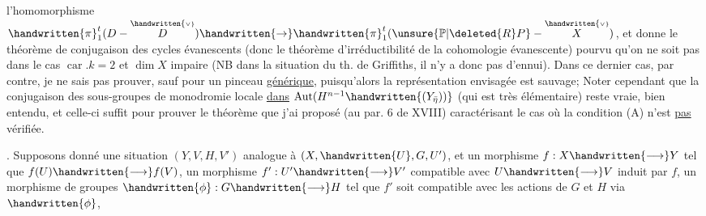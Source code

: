 l'homomorphisme $\handwritten{\pi}_1^t(D-\overset{\handwritten{\scriptscriptstyle\vee}}{D})\handwritten{\rightarrow}\handwritten{\pi}_1^t(\unsure{\mathbb{P}|\deleted{R}P}-\overset{\handwritten{\scriptscriptstyle\vee}}{X})$, et donne le théorème de conjugaison des cycles évanescents (donc le théorème d'irréductibilité de la cohomologie évanescente) pourvu qu'on ne soit pas dans le cas $\operatorname{car}.k=2$ et $\dim X$ impaire (NB  dans la situation du th. de Griffiths, il n'y a donc pas d'ennui). Dans ce dernier cas, par contre, je ne sais  pas prouver, sauf pour un pinceau \uline{générique}, puisqu'alors la représentation envisagée est sauvage;  Noter cependant que la conjugaison des sous-groupes de monodromie locale \uline{dans} $\operatorname{Aut}(H^{n-1}\handwritten{(Y_{\bar{\eta}}))}$ (qui est très élémentaire) reste vraie, bien entendu, et celle-ci suffit pour prouver le théorème que j'ai proposé (au par. 6 de XVIII) caractérisant le cas où la condition (A) n'est \uline{pas} vérifiée.


. Supposons donné une situation $(Y,V,H,V')$ analogue à $(X,\handwritten{U},G,U')$, et un morphisme $f:X\handwritten{\longrightarrow}Y$ tel que $f(U)\handwritten{\longrightarrow}f(V)$, un morphisme $f':U'\handwritten{\longrightarrow}V'$ compatible avec $U\handwritten{\longrightarrow}V$ induit par $f$, un morphisme de groupes $\handwritten{\phi}:G\handwritten{\longrightarrow}H$ tel que  $f'$ soit compatible avec les actions de $G$ et $H$ via $\handwritten{\phi}$, 

